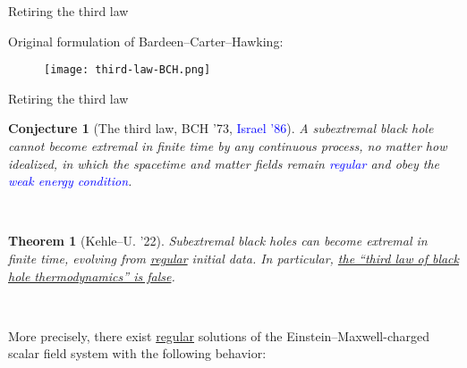 \documentclass[compress,usenames,dvipsnames,8pt]{beamer}
\newtheorem*{thm}{Theorem}
\newtheorem*{conjecture}{Conjecture}
\theoremstyle{definition}
\renewcommand{\(}{\begin{columns}}
\renewcommand{\)}{\end{columns}}
\newcommand{\<}[1]{\begin{column}{#1}}
\renewcommand{\>}{\end{column}}
\begin{document}
\begin{frame}{Retiring the third law}

\begin{center}
Original formulation of Bardeen--Carter--Hawking:
\end{center}

\begin{figure}
				\texttt{[image: third-law-BCH.png]}
			\end{figure}









\end{frame}


\begin{frame}{Retiring the third law}



\begin{conjecture}[The third law, BCH '73, \textcolor{blue}{Israel '86}]
 A subextremal black hole cannot become extremal in finite time by any continuous process, no matter how idealized, in which the spacetime and matter fields remain \textcolor{blue}{regular} and obey the \textcolor{blue}{weak energy condition}. 
\end{conjecture}

\pause

~\\

\begin{thm}[Kehle--U. '22]
Subextremal black holes can become extremal in finite time, evolving from \underline{regular} initial data. In particular, {\underline{the ``third law of black hole thermodynamics'' is false}}.
\end{thm}

~\\

\pause 

More precisely, there exist \underline{regular} solutions of the Einstein--Maxwell-charged scalar field system with the following behavior:


\end{frame}
\end{document}
